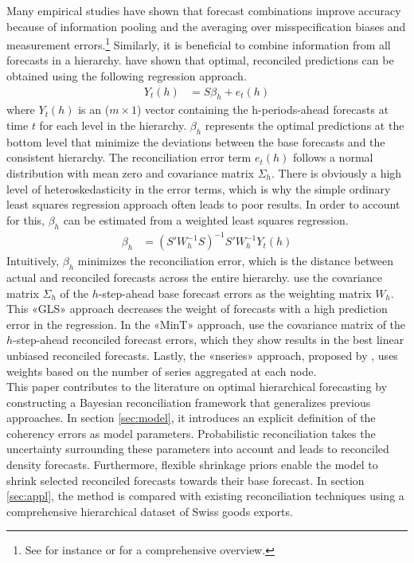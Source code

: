 \documentclass[a4paper,fleqn,11pt]{article}
\begin{document}
Many empirical studies have shown that forecast combinations improve accuracy because of information pooling and the averaging over misspecification biases and measurement errors.\footnote{See for instance \cite{Timmermann2006} or \cite{Watson2004} for a comprehensive overview.} Similarly, it is beneficial to combine information from all forecasts in a hierarchy. \cite{Hyndman2011} have shown that optimal, reconciled predictions can be obtained using the following regression approach.
\begin{align}
Y_t(h) &= S\beta_{h} + e_t(h)
\end{align}
where $Y_t(h)$ is an ($m \times 1$) vector containing the h-periods-ahead forecasts at time $t$ for each level in the hierarchy. $\beta_{h}$ represents the optimal predictions at the bottom level that minimize the deviations between the base forecasts and the consistent hierarchy. The reconciliation error term $e_t(h)$ follows a normal distribution with mean zero and covariance matrix $\Sigma_h$. There is obviously a high level of heteroskedasticity in the error terms, which is why the simple ordinary least squares regression approach often leads to poor results. In order to account for this, $\beta_h$ can be estimated from a weighted least squares regression.
\begin{align}
\label{eq:reg}
\beta_{h} &= \left(S'W_h^{-1}S \right)^{-1} S'W_h^{-1}Y_t(h)
\end{align}
Intuitively, $\beta_h$ minimizes the reconciliation error, which is the distance between actual and reconciled forecasts across the entire hierarchy. \cite{Hyndman2016} use the covariance matrix $\Sigma_h$ of the $h$-step-ahead base forecast errors as the weighting matrix $W_h$. This «GLS» approach decreases the weight of forecasts with a high prediction error in the regression. In the «MinT» approach, \cite{Wickramasuriya2015} use the covariance matrix of the $h$-step-ahead reconciled forecast errors, which they show results in the best linear unbiased reconciled forecasts. Lastly, the «nseries» approach, proposed by \cite{Athanasopoulos2017}, uses weights based on the number of series aggregated at each node.\\

This paper contributes to the literature on optimal hierarchical forecasting by constructing a Bayesian reconciliation framework that generalizes previous approaches. In section \ref{sec:model}, it introduces an explicit definition of the coherency errors as model parameters. Probabilistic reconciliation takes the uncertainty surrounding these parameters into account and leads to reconciled density forecasts. Furthermore, flexible shrinkage priors enable the model to shrink selected reconciled forecasts towards their base forecast. In section \ref{sec:appl}, the method is compared with existing reconciliation techniques using a comprehensive hierarchical dataset of Swiss goods exports.
\end{document}
